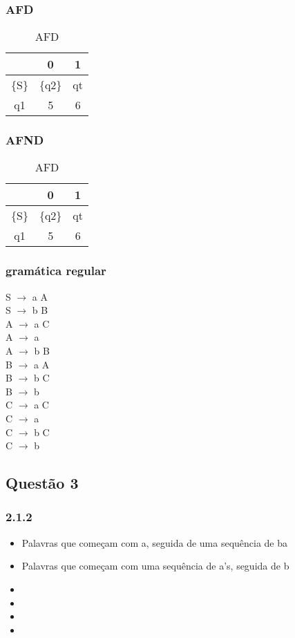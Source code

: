 \documentclass{article}
\begin{document}
	\subsubsection{AFD}
	\begin{table}[h]
	\centering
	\begin{tabular}{|c|c|c|}
		\hline
		& 0 & 1 \\
		\hline
		\{S\} & \{q2\} & qt \\
		q1 & 5 & 6 \\
		\hline
	\end{tabular}
	\caption{AFD}
\end{table}
	\subsubsection{AFND}
	\begin{table}[h]
		\centering
		\begin{tabular}{|c|c|c|}
			\hline
			& 0 & 1 \\
			\hline
			\{S\} & \{q2\} & qt \\
			q1 & 5 & 6 \\
			\hline
		\end{tabular}
		\caption{AFD}
	\end{table}
	\subsubsection{gramática regular}
	S $\rightarrow$ a A \\
	S $\rightarrow$ b B \\
	A $\rightarrow$ a C \\
	A $\rightarrow$ a \\
	A $\rightarrow$ b B \\
	B $\rightarrow$ a A \\
	B $\rightarrow$ b C \\
	B $\rightarrow$ b \\
	C $\rightarrow$ a C \\
	C $\rightarrow$ a \\
	C $\rightarrow$ b C \\
	C $\rightarrow$ b \\
	\subsection{Questão 3}	
	\subsubsection{2.1.2}
	\begin{itemize}
		\item 	Palavras que começam com a, seguida de uma sequência de ba
		\item Palavras que começam com uma sequência de a's, seguida de b
		\item 
		\item 
		\item 
		\item 
	\end{itemize}
\end{document}
